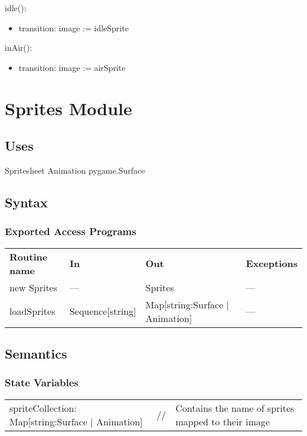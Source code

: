\documentclass[12pt]{article}
\begin{document}
idle():
\begin{itemize}
    \item transition: image := idleSprite
\end{itemize}

inAir():
\begin{itemize}
    \item transition: image := airSprite
\end{itemize}

\newpage

\section* {Sprites Module}

\subsection* {Uses}
Spritesheet
Animation
pygame.Surface
\subsection* {Syntax}

\subsubsection* {Exported Access Programs}

\begin{tabular}{| l | l | l | l |}
\hline
\textbf{Routine name} & \textbf{In} & \textbf{Out} & \textbf{Exceptions}\\
new Sprites & --- & Sprites & ---\\
\hline
loadSprites & Sequence[string] & Map[string:Surface | Animation] & ---\\
\hline
\end{tabular}

\subsection* {Semantics}

\subsubsection* {State Variables}

\begin{tabular}{lll}
    spriteCollection: Map[string:Surface | Animation] & // & Contains the name of sprites mapped to their image
\end{tabular}
\end{document}
